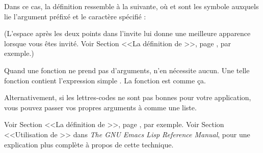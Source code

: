 Dans ce cas, la définition ressemble à la suivante, où  et
 sont les symbole auxquels  lie l'argument
préfixé et le caractère spécifié :
\begin{center}


  
\end{center}
(L'espace après les deux points dans l'invite lui donne une meilleure
apparence lorsque vous êtes invité. Voir Section  <<La
définition de >>, page , par exemple.)

Quand une fonction ne prend pas d'arguments,  n'en
nécessite aucun. Une telle fonction contient l'expression simple
. La fonction  est comme ça.

Alternativement, si les lettres-codes ne sont pas bonnes pour votre
application, vous pouvez passer vos propres arguments à
 comme une liste.

Voir Section  <<La définition de >>,
page , par exemple. Voir Section <<Utilisation de
>> dans \textit{The GNU Emacs Lisp Reference Manual},
pour une explication plus complète à propos de cette technique. 